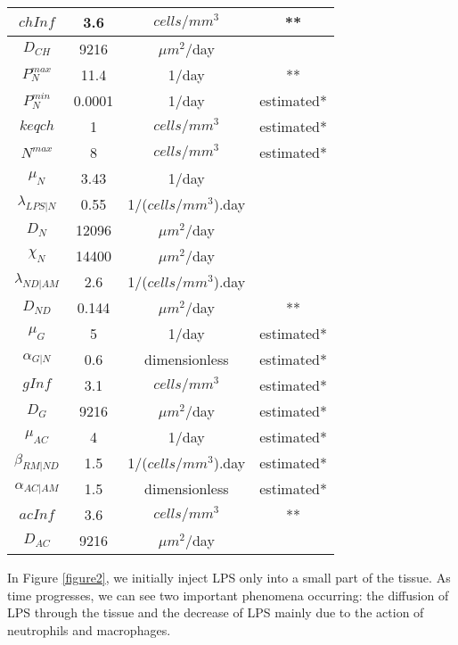 \documentclass[10pt]{bmc_article}
\newenvironment{bmcformat}{\baselineskip20pt\sloppy\setboolean{publ}{false}}{\baselineskip20pt\sloppy}
\begin{document}
\begin{bmcformat}
\begin{table}[htpb]
\begin{tabular}{cccc}
$chInf$ & 3.6 & $cells/mm^3$ & \cite{Waal1991}** \\
\hline 
$D_{CH}$ & 9216 &${\mu m}^2$/day & \cite{localmodel,Gammack2004}\\
\hline
$P^{max}_{N}$ & 11.4 & 1/day & \cite{Price1994}**\\
\hline 
$P^{min}_{N}$ & 0.0001 & 1/day & estimated*\\
\hline 
$keqch$ & 1 &  $cells/mm^3$ & estimated*\\
\hline 
$N^{max}$ & 8 &  $cells/mm^3$ & estimated*\\
\hline 
$\mu_N$ & 3.43 & 1/day & \cite{Edwards2003}\\
\hline 
$\lambda_{LPS|N}$ & 0.55 & 1/($cells/mm^3$).day & \cite{localmodel}\\
\hline 
$D_N$ & 12096 & ${\mu m}^2$/day & \cite{Felder1994} \\
\hline 
$\chi_{N}$ & 14400 & ${\mu m}^2$/day & \cite{Chettibi1994}\\
\hline 
$\lambda _{ND|AM}$ & 2.6 & 1/($cells/mm^3$).day & \cite{localmodel}\\
\hline
$D_{ND}$ & 0.144 & ${\mu m}^2$/day & \cite{localmodel}** \\
\hline 
$\mu_{G}$ & 5 & 1/day & estimated*\\
\hline 
$\alpha _{G|N}$ & 0.6 & dimensionless & estimated*\\
\hline 
$gInf$ & 3.1 & $cells/mm^3$ & estimated* \\
\hline 
$D_{G}$ & 9216 &${\mu m}^2$/day & estimated*\\
\hline 
$\mu_{AC}$ & 4 & 1/day & estimated*\\
\hline 
$\beta_{RM|ND}$ & 1.5 & 1/($cells/mm^3$).day & estimated*\\
\hline 
$\alpha_{AC|AM}$ & 1.5 & dimensionless & estimated*\\
\hline 
$acInf$ & 3.6 & $cells/mm^3$ & \cite{Waal1991}**\\
\hline 
$D_{AC}$ & 9216 &${\mu m}^2$/day & \cite{Gammack2004}
\end{tabular}
\label{parameters} 
\end{table}

In Figure \ref{figure2}, we initially inject LPS only into a small part of the tissue. 
As time progresses, we can see two important phenomena occurring: the diffusion of LPS through the tissue and the decrease of 
LPS mainly due to the action of neutrophils and macrophages.



\end{bmcformat}
\end{document}
